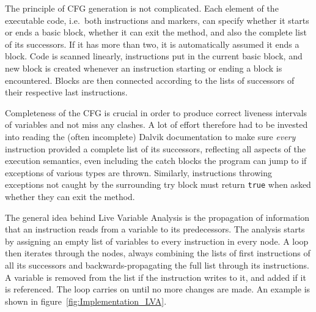 \documentclass[12pt,twoside,notitlepage]{report}
\begin{document}
The principle of CFG generation is not complicated. Each element of the executable code, i.e.\ both instructions and markers, can specify whether it starts or ends a basic block, whether it can exit the method, and also the complete list of its successors. If it has more than two, it is automatically assumed it ends a block. Code is scanned linearly, instructions put in the current basic block, and new block is created whenever an instruction starting or ending a block is encountered. Blocks are then connected according to the lists of successors of their respective last instructions.

Completeness of the CFG is crucial in order to produce correct liveness intervals of variables and not miss any clashes. A lot of effort therefore had to be invested into reading the (often incomplete) Dalvik documentation to make sure \emph{every} instruction provided a complete list of its successors, reflecting all aspects of the execution semantics, even including the catch blocks the program can jump to if exceptions of various types are thrown. Similarly, instructions throwing exceptions not caught by the surrounding try block must return \verb$true$ when asked whether they can exit the method.

The general idea behind Live Variable Analysis is the propagation of information that an instruction reads from a variable to its predecessors. The analysis starts by assigning an empty list of variables to every instruction in every node. A loop then iterates through the nodes, always combining the lists of first instructions of all its successors and backwards-propagating the full list through its instructions. A variable is removed from the list if the instruction writes to it, and added if it is referenced. The loop carries on until no more changes are made. An example is shown in figure~\ref{fig:Implementation_LVA}.
\end{document}
